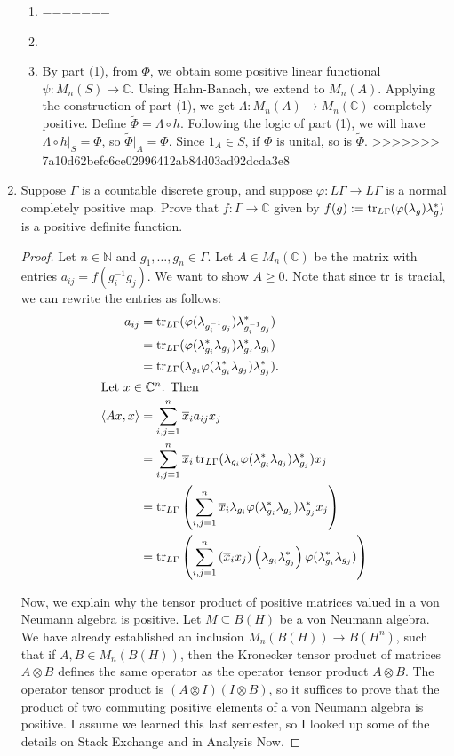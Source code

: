 \documentclass[a4paper,10pt]{report}
\newcommand{\ggen}[1]{\langle#1\rangle}
\newcommand{\ol}[1]{\overline{#1}}
\newcommand{\N}{\mathbb{N}}
\newcommand{\C}{\mathbb{C}}
\newcommand{\tens}{\otimes}
\begin{document}
\begin{enumerate}
\begin{enumerate}
                                
			\item 
=======
			\item 
			\item By part (1), from $\Phi$, we obtain some positive linear functional $\psi:M_n(S)\to\C$. Using Hahn-Banach, we extend to $M_n(A)$. Applying the construction of part (1), we get $\Lambda:M_n(A)\to M_n(\C)$ completely positive. Define $\widetilde{\Phi}=\Lambda\circ h$. Following the logic of part (1), we will have $\Lambda\circ h|_S=\Phi$, so $\widetilde{\Phi}|_A=\Phi$. Since $1_A\in S$, if $\Phi$ is unital, so is $\widetilde{\Phi}$. 
>>>>>>> 7a10d62befc6ce02996412ab84d03ad92dcda3e8
		\end{enumerate}
	\item	Suppose $\Gamma$ is a countable discrete group,
		and suppose $\varphi : L\Gamma \to L\Gamma$ is a normal completely positive map.
		Prove that $f : \Gamma \to \C$ given by $f(g) := \operatorname{tr}_{L\Gamma}(\varphi(\lambda_g)\lambda_g^*)$
		is a positive definite function.
		\begin{proof}
			Let $n \in \N$ and $g_1, \dots, g_n \in \Gamma$.
			Let $A \in M_n(\C)$ be the matrix with entries $a_{ij} = f(g_i^{-1}g_j)$.
			We want to show $A \ge 0$.
			Note that since $\operatorname{tr}$ is tracial, we can rewrite the entries as follows:
			\begin{align*}
				a_{ij} & = \tr_{L\Gamma}(\varphi(\lambda_{g_i^{-1}g_j})\lambda_{g_i^{-1}g_j}^*) \\
				 & = \tr_{L\Gamma}(\varphi(\lambda_{g_i}^* \lambda_{g_j})
				 \lambda_{g_j}^*\lambda_{g_i}) \\
				 & = \tr_{L\Gamma}(\lambda_{g_i}\varphi(\lambda_{g_i}^* \lambda_{g_j})
				 \lambda_{g_j}^*). \\
			\intertext{Let $x \in \C^n$. Then}
				\ggen{Ax, x} & = \sum_{i,j=1}^n{\ol{x}_i a_{ij} x_j} \\
				 & = \sum_{i,j=1}^n{\ol{x}_i \tr_{L\Gamma}(\lambda_{g_i}
				 \varphi(\lambda_{g_i}^* \lambda_{g_j})\lambda_{g_j}^*) x_j} \\
				 & = \tr_{L\Gamma}\left( \sum_{i,j=1}^n{\ol{x}_i \lambda_{g_i}
				 \varphi(\lambda_{g_i}^* \lambda_{g_j})\lambda_{g_j}^* x_j} \right) \\
				 & = \tr_{L\Gamma}\left( \sum_{i,j=1}^n{
				 \left( \ol{x}_i x_j \right)
				\left( \lambda_{g_i} \lambda_{g_j}^* \right)
				\varphi(\lambda_{g_i}^* \lambda_{g_j})} \right)
			\end{align*}
			
			Now, we explain why the tensor product of positive matrices valued in a von Neumann algebra is positive. Let $M\subseteq B(H)$ be a von Neumann algebra. We have already established an inclusion $M_n(B(H))\to B(H^n)$, such that if $A,B\in M_n(B(H))$, then the Kronecker tensor product of matrices $A\tens B$ defines the same operator as the operator tensor product $A\tens B$. The operator tensor product is $(A\tens I)(I\tens B)$, so it suffices to prove that the product of two commuting positive elements of a von Neumann algebra is positive. I assume we learned this last semester, so I looked up some of the details on Stack Exchange and in Analysis Now. 
		

\end{proof}
\end{enumerate}
\end{document}
